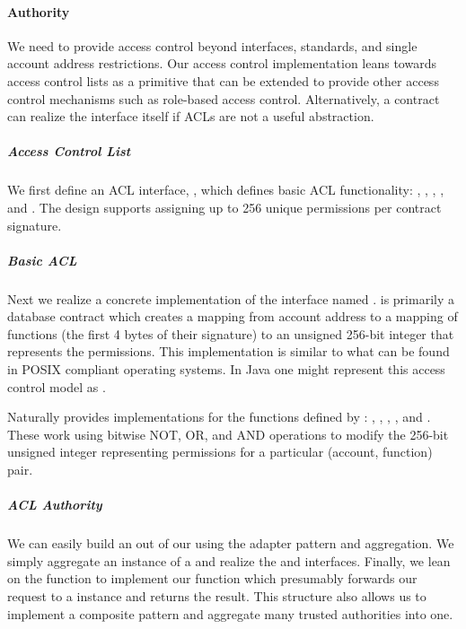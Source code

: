 \paragraph{Authority}
We need to provide access control beyond interfaces, standards, and single
account address restrictions. Our access control implementation leans towards
access control lists as a primitive that can be extended to provide other access
control mechanisms such as role-based access control. Alternatively, a contract
can realize the  interface itself if ACLs are not a useful
abstraction.

\subparagraph{Access Control List}
We first define an ACL interface, , which defines basic
ACL functionality: , ,
, , and .
The design supports assigning up to 256 unique permissions per contract
signature.

\subparagraph{Basic ACL}
Next we realize a concrete implementation of the 
interface named .  is primarily a
database contract which creates a mapping from account address to a mapping of
functions (the first 4 bytes of their signature) to an unsigned 256-bit integer
that represents the permissions. This implementation is similar to what can be
found in POSIX compliant operating systems. In Java one might represent this
access control model as .

Naturally  provides implementations for the functions defined by
: , ,
, , and .
These work using bitwise NOT, OR, and AND operations to modify the 256-bit
unsigned integer representing permissions for a particular (account, function)
pair.

\subparagraph{ACL Authority}
We can easily build an  out of our  using the
adapter pattern and aggregation. We simply aggregate an instance of a
 and realize the  and 
interfaces. Finally, we lean on the  function to implement
our  function which presumably forwards our request to a
 instance and returns the result. This structure also allows us to
implement a composite pattern and aggregate many trusted authorities into one.

